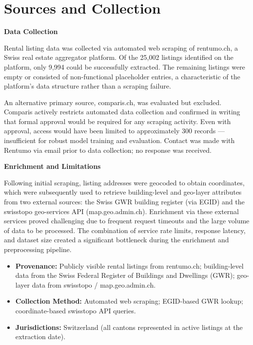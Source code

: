 \documentclass[11pt, a4paper]{article}
\begin{document}
\section{Sources and Collection}

\textbf{Data Collection}

\vspace{0.3em}
Rental listing data was collected via automated web scraping of rentumo.ch, a Swiss real estate aggregator platform. Of the 25{,}002 listings identified on the platform, only 9{,}994 could be successfully extracted. The remaining listings were empty or consisted of non-functional placeholder entries, a characteristic of the platform's data structure rather than a scraping failure.

An alternative primary source, comparis.ch, was evaluated but excluded. Comparis actively restricts automated data collection and confirmed in writing that formal approval would be required for any scraping activity. Even with approval, access would have been limited to approximately 300 records --- insufficient for robust model training and evaluation. Contact was made with Rentumo via email prior to data collection; no response was received.

\vspace{0.5em}
\textbf{Enrichment and Limitations}

\vspace{0.3em}
Following initial scraping, listing addresses were geocoded to obtain coordinates, which were subsequently used to retrieve building-level and geo-layer attributes from two external sources: the Swiss GWR building register (via EGID) and the swisstopo geo-services API (map.geo.admin.ch). Enrichment via these external services proved challenging due to frequent request timeouts and the large volume of data to be processed. The combination of service rate limits, response latency, and dataset size created a significant bottleneck during the enrichment and preprocessing pipeline.

\begin{itemize}
    \item \textbf{Provenance:} Publicly visible rental listings from rentumo.ch; building-level data from the Swiss Federal Register of Buildings and Dwellings (GWR); geo-layer data from swisstopo / map.geo.admin.ch.
    \item \textbf{Collection Method:} Automated web scraping; EGID-based GWR lookup; coordinate-based swisstopo API queries.
    \item \textbf{Jurisdictions:} Switzerland (all cantons represented in active listings at the extraction date).
\end{itemize}
\end{document}
